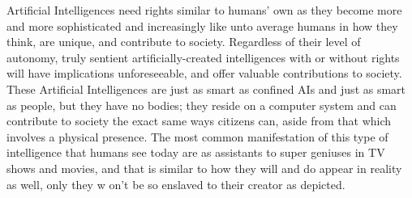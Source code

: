 Artificial Intelligences need rights similar to humans' own as they become more and more sophisticated and increasingly like unto average humans in how they think, are unique, and contribute to society. Regardless of their level of autonomy, truly sentient artificially-created intelligences with or without rights will have implications unforeseeable, and offer valuable contributions to society. These Artificial Intelligences are just as smart as confined AIs and just as smart as people, but they have no bodies; they reside on a computer system and can contribute to society the exact same ways citizens can, aside from that which involves a physical presence. The most common manifestation of this type of intelligence that humans see today are as assistants to super geniuses in TV shows and movies, and that is similar to how they will and do appear in reality as well, only they w on't be so enslaved to their creator as depicted.